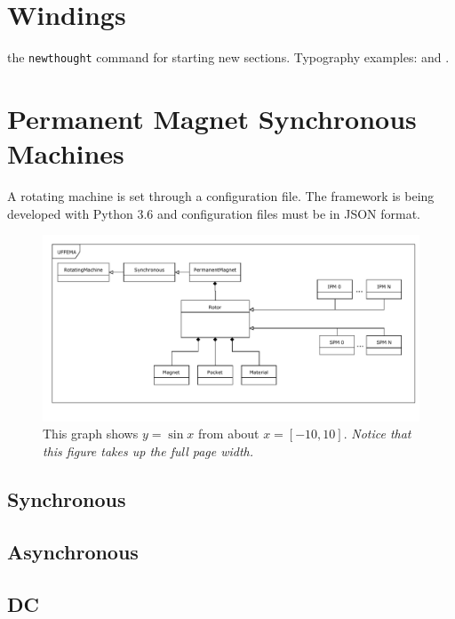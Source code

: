\documentclass[justified]{tufte-book} %
\begin{document}
\chapter{Windings}\label{ch:windings}




 the \texttt{newthought} command for starting new sections. Typography examples:  and .


\chapter{Permanent Magnet Synchronous Machines}
\label{ch:1}

A rotating machine is set through a configuration file. The framework is being developed with Python 3.6 and configuration files must be in JSON format. 

\begin{figure}[h]
\includegraphics[width=\linewidth]{Rotor_PermanentMagnet.pdf}
\caption{This graph shows $y = \sin x$ from about $x = [-10, 10]$.
\emph{Notice that this figure takes up the full page width.}}
\label{fig:fullfig}
\end{figure}

\section{Synchronous}

\section{Asynchronous}

\section{DC}
\end{document}
